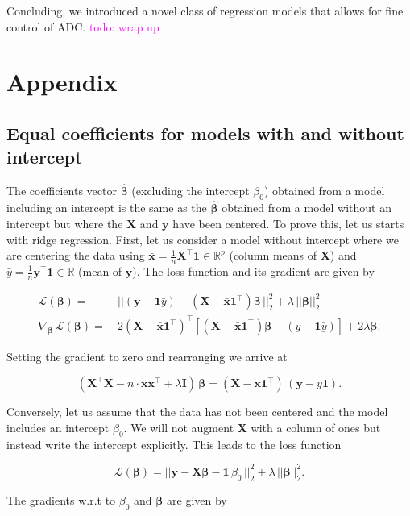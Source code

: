 \documentclass[utf8]{frontiersSCNS} %
\newcommand{\todo}[1]{\textcolor{Magenta}{todo: #1}}
\renewcommand{\b}{\boldsymbol{\beta}} %
\newcommand{\bh}{\boldsymbol{\hat{\beta}}} %
\newcommand{\I}{\mathbf{I}}
\renewcommand{\L}{\mathcal{L}}
\newcommand{\mx}{\mathbf{\bar{x}}}
\newcommand{\my}{\bar{y}}
\newcommand{\one}{\mathbf{1}}
\newcommand{\R}{\mathbb{R}}
\newcommand{\X}{\mathbf{X}}
\newcommand{\y}{\mathbf{y}}
\begin{document}
Concluding, we introduced a novel class of regression models that allows for fine control of ADC. \todo{wrap up}

\section{Appendix}

\subsection{Equal coefficients for models with and without intercept}\label{app:equal_coefficients}

The coefficients vector $\bh$ (excluding the intercept $\beta_0$) obtained from a model including an intercept is the same as the $\bh$ obtained from a model without an intercept but where the $\X$ and $\y$ have been centered. To prove this, let us starts with ridge regression. First, let us consider a model without intercept where we are centering the data using $\mx=\frac{1}{n}\X^\top\one\in\R^p$ (column means of $\X$) and $\my=\frac{1}{n}\y^\top\one\in\R$ (mean of $\y$). The loss function and its gradient are given by

\begin{equation*}
\begin{split}
\L(\b) =&\ ||(\y-\one\my) - (\X - \mx\one^\top)\b\,||^2_2 + \lambda\,||\b||^2_2\\
\nabla_{\b}\, \L(\b) =&\ 2(\X-\mx\one^\top)^\top[(\X-\mx\one^\top)\b - (y-\one\my)] + 2\lambda\b.
\end{split}
\end{equation*}


Setting the gradient to zero and rearranging we arrive at 

\begin{equation}\label{eq:equal_coefficients1}
(\X^\top\X - n\cdot\mx\mx^\top + \lambda\I)\,\b = (\X-\mx\one^\top)\,(\y-\my\one).
\end{equation}

Conversely, let us assume that the data has not been centered and the model includes an intercept $\beta_0$.
We will not augment $\X$ with a column of ones but instead write the intercept explicitly. This leads to the loss function 

\[
\L(\b) = ||\y - \X\b - \one\,\beta_0\,||^2_2 + \lambda\,||\b||^2_2.
\]

The gradients w.r.t to $\beta_0$ and $\b$ are given by
\end{document}
